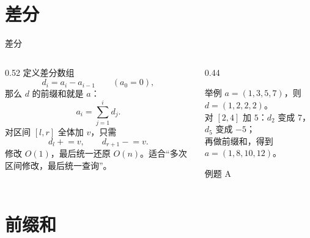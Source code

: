 \documentclass[aspectratio=169]{beamer}
\begin{document}
\section{差分}

\begin{frame}{差分}
    \begin{columns}[T]
        \begin{column}{0.52\textwidth}
            \small
            定义差分数组
            \[
                d_i=a_i-a_{i-1}\qquad (a_0=0),
            \]
            那么 $d$ 的前缀和就是 $a$：
            \[
                a_i=\sum_{j=1}^{i}d_j.
            \]
            对区间 $[l,r]$ 全体加 $v$，只需
            \[
                d_l\mathrel{+}=v,\qquad d_{r+1}\mathrel{-}=v.
            \]
            修改 $O(1)$，最后统一还原 $O(n)$。适合“多次区间修改，最后统一查询”。
        \end{column}
        \begin{column}{0.44\textwidth}
            \begin{exampleblock}{举例}
                \footnotesize
                $a=(1,3,5,7)$，则 $d=(1,2,2,2)$。\\
                对 $[2,4]$ 加 $5$：$d_2$ 变成 $7$，$d_5$ 变成 $-5$；\\
                再做前缀和，得到 $a=(1,8,10,12)$。
            \end{exampleblock}
            \vspace{1em}
            例题 A
        \end{column}
    \end{columns}
\end{frame}

\section{前缀和}
\end{document}

